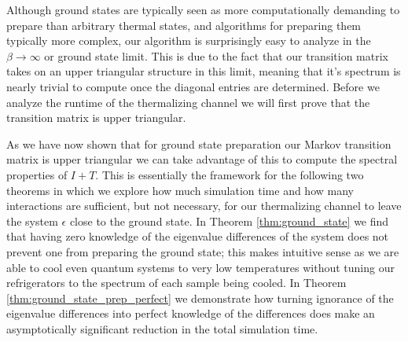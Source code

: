 \documentclass{article}
\begin{document}
Although ground states are typically seen as more computationally demanding to prepare than arbitrary thermal states, and algorithms for preparing them typically more complex, our algorithm is surprisingly easy to analyze in the $\beta \to \infty$ or ground state limit. This is due to the fact that our transition matrix takes on an upper triangular structure in this limit, meaning that it's spectrum is nearly trivial to compute once the diagonal entries are determined. Before we analyze the runtime of the thermalizing channel we will first prove that the transition matrix is upper triangular.


As we have now shown that for ground state preparation our Markov transition matrix is upper triangular we can take advantage of this to compute the spectral properties of $I + T$. This is essentially the framework for the following two theorems in which we explore how much simulation time and how many interactions are sufficient, but not necessary, for our thermalizing channel to leave the system $\epsilon$ close to the ground state. In Theorem \ref{thm:ground_state} we find that  having zero knowledge of the eigenvalue differences of the system does not prevent one from preparing the ground state; this makes intuitive sense as we are able to cool even quantum systems to very low temperatures without tuning our refrigerators to the spectrum of each sample being cooled. In Theorem \ref{thm:ground_state_prep_perfect} we demonstrate how turning ignorance of the eigenvalue differences into perfect knowledge of the differences does make an asymptotically significant reduction in the total simulation time.
\end{document}
